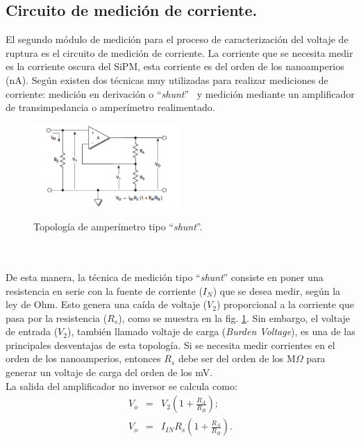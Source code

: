 \subsection{Circuito de medición de corriente.}
El segundo módulo de medición para el proceso de caracterización del voltaje de ruptura es el circuito de medición de corriente. La corriente que se necesita medir es la corriente oscura del  SiPM, esta corriente es del orden de los nanoamperios (nA). Según \citep{low_level} existen dos técnicas muy utilizadas para realizar mediciones de corriente: medición en derivación o ``\textit{shunt}'' ~y medición mediante un amplificador de transimpedancia o amperímetro realimentado.
\begin{figure}[h!]
\begin{centering}
    \caption{Topología de amperímetro tipo ``\textit{shunt}''. }
    \includegraphics[width=0.5\textwidth]{Images/Shunt.png}
    \label{fig:shunt_circuit}
  \par\end{centering}
\end{figure}
\\ \\
De esta manera, la técnica de medición tipo ``\textit{shunt}'' consiste en poner una resistencia en serie con la fuente de corriente ($I_N$) que se desea medir, según la ley de Ohm. Esto genera una caída de voltaje ($V_2$) proporcional a la corriente que pasa por la resistencia ($R_s$), como se muestra en la fig. \ref{fig:shunt_circuit}. Sin embargo, el voltaje de entrada ($V_2$), también llamado voltaje de carga (\textit{Burden Voltage}), es una de las principales desventajas de esta topología. Si se necesita medir corrientes en el orden de los nanoamperios, entonces $R_s$ debe ser del orden de los M$\Omega$ para generar un voltaje de carga del orden de los mV.\\
La salida del amplificador no inversor se calcula como: 
\begin{eqnarray}
    V_o &=& V_2\left(1+\frac{R_A}{R_B}\right);\\
     V_o &=& I_{IN}R_s\left(1+\frac{R_A}{R_B}\right).
\end{eqnarray}
